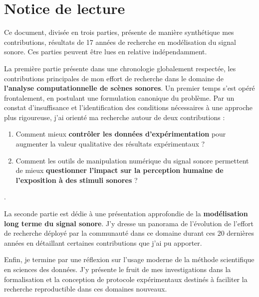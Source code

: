 \chapter{Notice de lecture}

Ce document, divisée en trois parties, présente de manière synthétique mes contributions, résultats de 17 années de recherche en modélisation du signal sonore. Ces parties peuvent être lues en relative indépendamment.

La première partie présente dans une chronologie globalement respectée, les contributions principales de mon effort de recherche dans le domaine de \textbf{l'analyse computationnelle de scènes sonores}. Un premier temps s'est opéré frontalement, en postulant une formulation canonique du problème. Par un constat d'insuffisance et l'identification des conditions nécessaires à une approche plus rigoureuse, j'ai orienté ma recherche autour de deux contributions :
\begin{enumerate}
  \item Comment mieux \textbf{contrôler les données d'expérimentation} pour augmenter la valeur qualitative des résultats expérimentaux ?
  \item Comment les outils de manipulation numérique du signal sonore permettent de mieux \textbf{questionner l'impact sur la perception humaine de l'exposition à des stimuli sonores} ?
\end{enumerate}.

La seconde partie est dédie à une présentation approfondie de la \textbf{modélisation long terme du signal sonore}. J'y dresse un panorama de l'évolution de l'effort de recherche déployé par la communauté dans ce domaine durant ces 20 dernières années en détaillant certaines contributions que j'ai pu apporter.

Enfin, je termine par une réflexion sur l'usage moderne de la méthode scientifique en sciences des données. J'y présente le fruit de mes investigations dans la formalisation et la conception de protocole expérimentaux destinés à faciliter la recherche reproductible dans ces domaines nouveaux.

